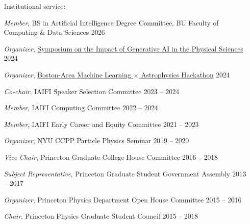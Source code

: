 \documentclass[letterpaper,11pt]{article}
\newenvironment{packed_itemize}{
\begin{itemize}[label=\raisebox{0.25ex}{\tiny$\bullet$}, topsep=0pt, partopsep=0pt]
  \setlength{\itemsep}{4.0pt}
  \setlength{\parskip}{0pt}
  \setlength{\parsep}{0pt}}{\end{itemize}
}
\begin{document}
\vspace{2mm}

  \noindent
Institutional service:
  \begin{packed_itemize}
  \item \emph{Member}, BS in Artificial Intelligence Degree Committee, BU Faculty of Computing \& Data Sciences \hfill 2026
  \item \emph{Organizer}, \href{https://iaifi.org/generative-ai-workshop}{Symposium on the Impact of Generative AI in the Physical Sciences}  \hfill 2024
  \item \emph{Organizer}, \href{https://iaifi.org/hackathon.html}{Boston-Area Machine Learning $\times$ Astrophysics Hackathon}  \hfill 2024
  \item \emph{Co-chair}, IAIFI Speaker Selection Committee  \hfill 2023 -- 2024
  \item \emph{Member}, IAIFI Computing Committee  \hfill 2022 -- 2024
  \item \emph{Member}, IAIFI Early Career and Equity Committee  \hfill 2021 -- 2023
  \item \emph{Organizer}, NYU CCPP Particle Physics Seminar \hfill 2019 -- 2020
  \item \emph{Vice Chair}, Princeton Graduate College House Committee \hfill 2016 -- 2018
  \item \emph{Subject Representative}, Princeton Graduate Student Government Assembly \hfill 2013 -- 2017
  \item \emph{Organizer}, Princeton Physics Department Open House Committee  \hfill 2015 -- 2016
  \item \emph{Chair}, Princeton Physics Graduate Student Council \hfill 2015 -- 2018
\end{packed_itemize}

\vspace{2mm}
\end{document}
